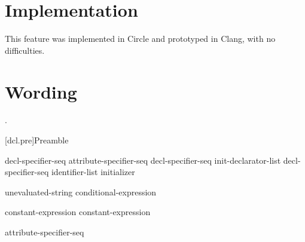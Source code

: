 \documentclass{wg21}
\begin{document}
\section{Implementation}

This feature was implemented in Circle and prototyped in Clang, with no difficulties.

\section{Wording}

.



[dcl.pre]{Preamble}

\begin{bnf}
    \br
    decl-specifier-seq  \terminal{;}\br
    attribute-specifier-seq decl-specifier-seq init-declarator-list \terminal{;}\br
     decl-specifier-seq  \terminal{[} identifier-list \terminal{]} initializer \terminal{;}
\end{bnf}

\begin{addedblock}
\begin{bnf}
    \br
        unevaluated-string\br
        conditional-expression\br
\end{bnf}
\end{addedblock}

\begin{bnf}
    \br
     \terminal{(} constant-expression \terminal{)} \terminal{;}\br
     \terminal{(} constant-expression \terminal{,}  \terminal{)} \terminal{;}\br
\end{bnf}

\begin{bnf}
    \br
    \terminal{;}
\end{bnf}

\begin{bnf}
    \br
    attribute-specifier-seq \terminal{;}
\end{bnf}
\end{document}
